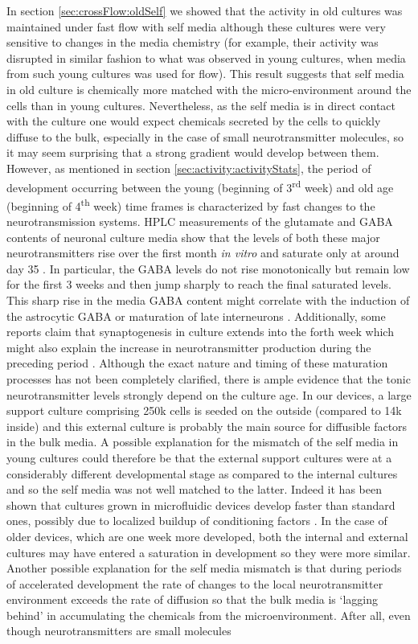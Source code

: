 In section \ref{sec:crossFlow:oldSelf} we showed that the activity in old cultures was maintained under fast flow with self media although these cultures were very sensitive to changes in the media chemistry (for example, their activity was disrupted in similar fashion to what was observed in young cultures, when media from such young cultures was used for flow). This result suggests that self media in old culture is chemically more matched with the micro-environment around the cells than in young cultures. Nevertheless, as the self media is in direct contact with the culture one would expect chemicals secreted by the cells to quickly diffuse to the bulk, especially in the case of small neurotransmitter molecules, so it may seem surprising that a strong gradient would develop between them. However, as mentioned in section \ref{sec:activity:activityStats}, the period of development occurring between the young (beginning of 3\textsuperscript{rd} week) and old age (beginning of 4\textsuperscript{th} week) time frames is characterized by fast changes to the neurotransmission systems. HPLC measurements of the glutamate and GABA contents of neuronal culture media show that the levels of both these major neurotransmitters rise over the first month \textit{in vitro} and saturate only at around day 35 \cite{ramakers1994activity}. In particular, the GABA levels do not rise monotonically but remain low for the first 3 weeks and then jump sharply to reach the final saturated levels. This sharp rise in the media GABA content might correlate with the induction of the astrocytic GABA \cite{lee2010channel} or maturation of late interneurons \cite{hensch2005critical}. Additionally, some reports claim that synaptogenesis in culture extends into the forth week which might also explain the increase in neurotransmitter production during the preceding period \cite{brewer2008neuron,grabrucker2009synaptogenesis}. Although the exact nature and timing of these maturation processes has not been completely clarified, there is ample evidence that the tonic neurotransmitter levels strongly depend on the culture age. In our devices, a large support culture comprising 250k cells is seeded on the outside (compared to 14k inside) and this external culture is probably the main source for diffusible factors in the bulk media. A possible explanation for the mismatch of the self media in young cultures could therefore be that the external support cultures were at a considerably different developmental stage as compared to the internal cultures and so the self media was not well matched to the latter. Indeed it has been shown that cultures grown in microfluidic devices develop faster than standard ones, possibly due to localized buildup of conditioning factors \cite{goyal2011neuronal}. In the case of older devices, which are one week more developed, both the internal and external cultures may have entered a saturation in development so they were more similar. Another possible explanation for the self media mismatch is that during periods of accelerated development the rate of changes to the local neurotransmitter environment exceeds the rate of diffusion so that the bulk media is `lagging behind' in accumulating the chemicals from the microenvironment. After all, even though neurotransmitters are small molecules 